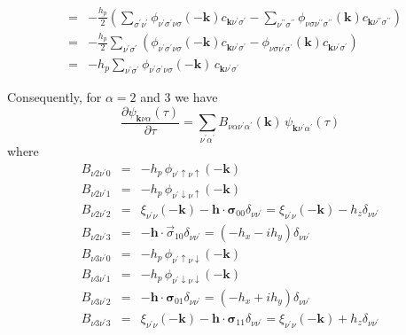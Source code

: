 \begin{eqnarray}
& = & -\frac{h_p}{2}
\left(
\sum_{\sigma^{\prime}\nu^{\prime}} \phi_{\nu^{\prime}\sigma^{\prime}\nu\sigma}(-\mathbf{k})
c_{\mathbf{k}\nu^{\prime}\sigma^{\prime}} -
\sum_{\nu^{\prime\prime}\sigma^{\prime\prime}}
\phi_{\nu\sigma\nu^{\prime\prime}\sigma^{\prime\prime}}(\mathbf{k})
c_{\mathbf{k}\nu^{\prime\prime}\sigma^{\prime\prime}} \right) \\
& = & -\frac{h_p}{2}
\sum_{\nu^{\prime}\sigma^{\prime}}
\left(\phi_{\nu^{\prime}\sigma^{\prime}\nu\sigma}(-\mathbf{k})
c_{\mathbf{k}\nu^{\prime}\sigma^{\prime}} -
\phi_{\nu\sigma\nu^{\prime}\sigma^{\prime}}(\mathbf{k})
c_{\mathbf{k}\nu^{\prime}\sigma^{\prime}} \right) \\
& = &  -h_p
\sum_{\nu^{\prime}\sigma^{\prime}}
\phi_{\nu^{\prime}\sigma^{\prime}\nu\sigma}(-\mathbf{k})\,
c_{\mathbf{k}\nu^{\prime}\sigma^{\prime}}
\end{eqnarray}

Consequently, for $\alpha = 2$ and 3 we have
\begin{equation}
\frac{\partial \psi_{\mathbf{k}\nu\alpha}(\tau)}{\partial \tau}
 = \sum_{\nu^{\prime}\alpha^{\prime}}
B_{\nu\alpha\nu^{\prime}\alpha^{\prime}}(\mathbf{k})\,
\psi_{\mathbf{k}\nu^{\prime}\alpha^{\prime}}(\tau)
\end{equation}
where
\begin{eqnarray}
B_{\nu 2 \nu^{\prime} 0} & = & -h_p\, 
\phi_{\nu^{\prime}\uparrow\nu\uparrow}(-\mathbf{k}) \\
B_{\nu 2 \nu^{\prime} 1} & = & -h_p\, 
\phi_{\nu^{\prime}\downarrow\nu\uparrow}(-\mathbf{k}) \\
B_{\nu 2 \nu^{\prime}2} & = & \xi_{\nu^{\prime}\nu}(-\mathbf{k}) -
\mathbf{h}\cdot\mathbf{\sigma}_{00}\delta_{\nu\nu^{\prime}}
= \xi_{\nu^{\prime}\nu}(-\mathbf{k}) - h_z\delta_{\nu\nu^{\prime}} \\
B_{\nu 2 \nu^{\prime}3} & = &  -\mathbf{h}\cdot\vec{\sigma}_{10}
\delta_{\nu\nu^{\prime}}
= \left(-h_x -ih_y\right)\delta_{\nu\nu^{\prime}} \\
B_{\nu 3 \nu^{\prime}0} & = &  -h_p\, \phi_{\nu^{\prime}\uparrow\nu\downarrow}(-\mathbf{k}) \\
B_{\nu 3 \nu^{\prime}1} & = & -h_p\, 
\phi_{\nu^{\prime}\downarrow\nu\downarrow}(-\mathbf{k}) \\ 
B_{\nu 3 \nu^{\prime}2} & = & -\mathbf{h}\cdot\mathbf{\sigma}_{01}
\delta_{\nu\nu^{\prime}} =
\left(-h_x + ih_y\right)\delta_{\nu\nu^{\prime}} \\
B_{\nu 3 \nu^{\prime}3} & = & 
\xi_{\nu^{\prime}\nu}(-\mathbf{k}) -
\mathbf{h}\cdot\mathbf{\sigma}_{11}\delta_{\nu\nu^{\prime}}
= \xi_{\nu^{\prime}\nu}(-\mathbf{k}) + h_z\delta_{\nu\nu^{\prime}}  \\
\end{eqnarray}

